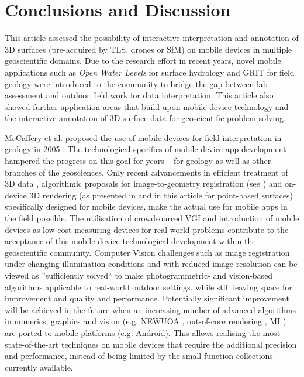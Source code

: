 \documentclass[review]{elsarticle}
\begin{document}
\section{Conclusions and Discussion}
\label{sec:conclusions}

This article assessed the possibility of interactive interpretation and annotation of 3D surfaces (pre-acquired by \gls{TLS}, drones or \gls{SfM}) on mobile devices in multiple geoscientific domains. Due to the research effort in recent years, novel mobile applications such as \textit{Open Water Levels} for surface hydrology and \gls{GRIT} for field geology were introduced to the community to bridge the gap between lab assessment and outdoor field work for data interpretation. This article also showed further application areas that build upon mobile device technology and the interactive annotation of 3D surface data for geoscientific problem solving.

McCaffery et al. proposed the use of mobile devices for field interpretation in geology in 2005 \cite{McCaffrey2005}. The technological specifics of mobile device app development hampered the progress on this goal for years -- for geology as well as other branches of the geosciences. Only recent advancements in efficient treatment of 3D data \cite{Kroehnert2017b}, algorithmic proposals for image-to-geometry registration (see \citep{Gauglitz2014,Kehl2017_VGC}) and on-device 3D rendering (as presented in \cite{Agus2017} and in this article for point-based surfaces) specifically designed for mobile devices, make the actual use for mobile apps in the field possible. The utilisation of crowdsourced \gls{VGI} and introduction of mobile devices as low-cost measuring devices for real-world problems \cite{Eltner2017} contribute to the acceptance of this mobile device technological development within the geoscientific community. Computer Vision challenges such as image registration under changing illumination conditions and with reduced image resolution can be viewed as ''sufficiently solved`` to make photogrammetric- and vision-based algorithms applicable to real-world outdoor settings, while still leaving space for improvement and quality and performance. Potentially significant improvement will be achieved in the future when an increasing number of advanced algorithms in numerics, graphics and vision (e.g. NEWUOA \cite{Powell2006}, out-of-core rendering \cite{Borgeat2005}, \gls{MI} \cite{Viola1997}) are ported to mobile platforms (e.g. Android). This allows realising the most state-of-the-art techniques on mobile devices that require the additional precision and performance, instead of being limited by the small function collections currently available.
\end{document}
